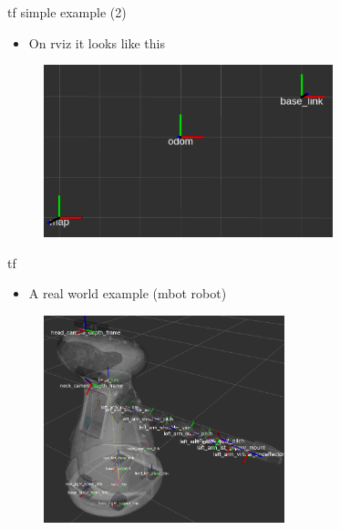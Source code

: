 \documentclass{beamer}
\begin{document}
\begin{frame}{tf simple example (2)}
	
	\begin{itemize}
		\item On rviz it looks like this
	\end{itemize}
	
	\begin{figure}[H]
		\centering
		\includegraphics[height=5.0cm]{images/rviz_visualization.png}
	\end{figure}
	
\end{frame}


\begin{frame}{tf}
	\begin{itemize}
		\item A real world example (mbot robot)
	\end{itemize}
	
	\begin{figure}[H]
		\centering
		\includegraphics[height=6.0cm]{images/mbot_frames.png}
	\end{figure}
	
\end{frame}

\end{document}
